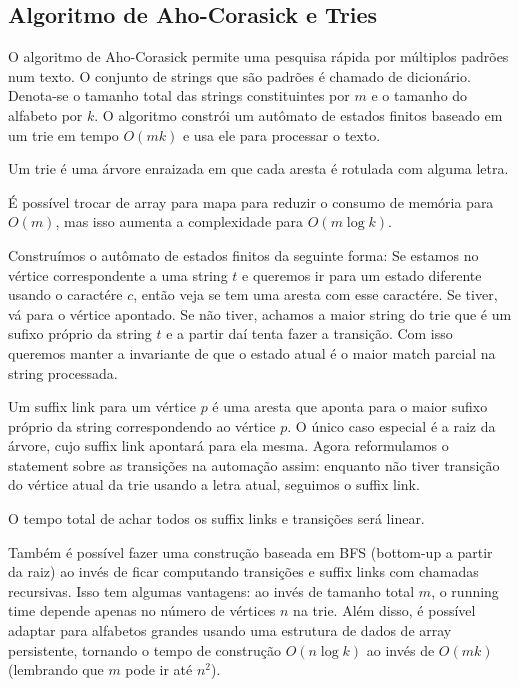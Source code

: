 \subsection{Algoritmo de Aho-Corasick e Tries}

O algoritmo de Aho-Corasick permite uma pesquisa rápida por múltiplos padrões num texto. O conjunto de strings que são padrões é chamado de dicionário. Denota-se o tamanho total das strings constituintes por $m$ e o tamanho do alfabeto por $k$. O algoritmo constrói um autômato de estados finitos baseado em um trie em tempo $O(mk)$ e usa ele para processar o texto.

Um trie é uma árvore enraizada em que cada aresta é rotulada com alguma letra.


É possível trocar de array para mapa para reduzir o consumo de memória para $O(m)$, mas isso aumenta a complexidade para $O(m \log k)$.

Construímos o autômato de estados finitos da seguinte forma: Se estamos no vértice correspondente a uma string $t$ e queremos ir para um estado diferente usando o caractére $c$, então veja se tem uma aresta com esse caractére. Se tiver, vá para o vértice apontado. Se não tiver, achamos a maior string do trie que é um sufixo próprio da string $t$ e a partir daí tenta fazer a transição. Com isso queremos manter a invariante de que o estado atual é o maior match parcial na string processada. 

Um suffix link para um vértice $p$ é uma aresta que aponta para o maior sufixo próprio da string correspondendo ao vértice $p$. O único caso especial é a raiz da árvore, cujo suffix link apontará para ela mesma. Agora reformulamos o statement sobre as transições na automação assim: enquanto não tiver transição do vértice atual da trie usando a letra atual, seguimos o suffix link.


O tempo total de achar todos os suffix links e transições será linear.

Também é possível fazer uma construção baseada em BFS (bottom-up a partir da raiz) ao invés de ficar computando transições e suffix links com chamadas recursivas. Isso tem algumas vantagens: ao invés de tamanho total $m$, o running time depende apenas no número de vértices $n$ na trie. Além disso, é possível adaptar para alfabetos grandes usando uma estrutura de dados de array persistente, tornando o tempo de construção $O(n \log k)$ ao invés de $O(m k)$ (lembrando que $m$ pode ir até $n^2$).

